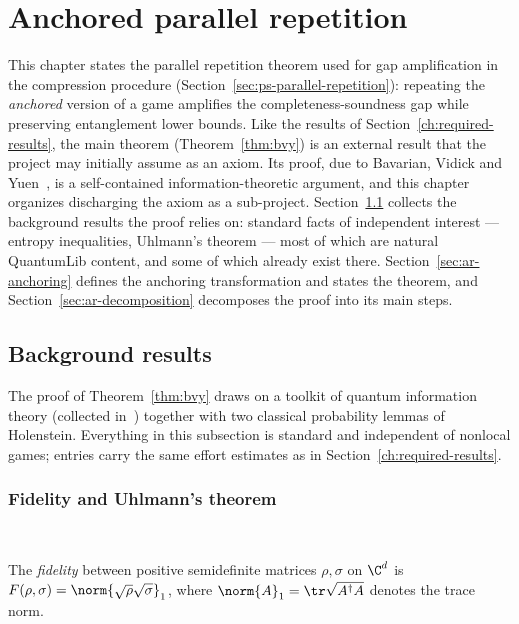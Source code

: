 \section{Anchored parallel repetition}
\label{ch:anchored-repetition}

This chapter states the parallel repetition theorem used for gap amplification in the
compression procedure (Section~\ref{sec:ps-parallel-repetition}): repeating the
\emph{anchored} version of a game amplifies the completeness-soundness gap while
preserving entanglement lower bounds. Like the results of
Section~\ref{ch:required-results}, the main theorem (Theorem~\ref{thm:bvy}) is an
external result that the project may initially assume as an axiom. Its proof, due to
Bavarian, Vidick and Yuen~\cite{BVY17}, is a self-contained information-theoretic
argument, and this chapter organizes discharging the axiom as a sub-project.
Section~\ref{sec:ar-background} collects the background results the proof relies on:
standard facts of independent interest --- entropy inequalities, Uhlmann's theorem ---
most of which are natural QuantumLib content, and some of which already exist there.
Section~\ref{sec:ar-anchoring} defines the anchoring transformation and states the
theorem, and Section~\ref{sec:ar-decomposition} decomposes the proof into its main
steps.

\subsection{Background results}
\label{sec:ar-background}

The proof of Theorem~\ref{thm:bvy} draws on a toolkit of quantum information theory
(collected in~\cite[Section 5.1]{BVY17}) together with two classical probability
lemmas of Holenstein. Everything in this subsection is standard and independent of
nonlocal games; entries carry the same effort estimates as in
Section~\ref{ch:required-results}.

\subsubsection{Fidelity and Uhlmann's theorem}
\label{sec:ar-fidelity}

\effortMedium\ \qlib

\begin{definition}[Fidelity]
\label{def:fidelity}
\qlib{}
The \emph{fidelity} between positive semidefinite matrices $\rho, \sigma$ on $\C^d$ is
$F(\rho, \sigma) = \norm{\sqrt{\rho}\sqrt{\sigma}}_1$, where $\norm{A}_1 =
\tr\sqrt{A^\dagger A}$ denotes the trace norm.
\end{definition}

